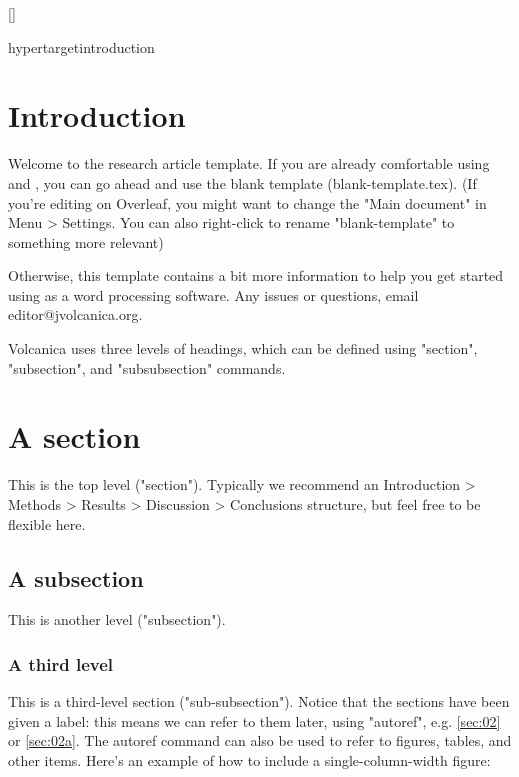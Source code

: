 \documentclass[draft, {\secondLanguage}, english]{VolcanicaStyle-production}
\author[{{\affiliation{1}}}] 				%
{\orcidaffil{0000.0000.0000.0000}~			%
Person A. G. Persondóttir%
\Email{email@address.io}} 		        	%
\author[{{\affiliation{2}}}] 				%
{\orcidaffil{0000.0000.0000.0000}~			%
Someone Else} 					        	%
\author[{{\affiliation{3}}}] 				%
{\orcidaffil{0000.0000.0000.0000}~			%
Another S. Cientist}						%
\affil[{{\affiliation{1}}}]{					%
The first affiliation.
}
\affil[{{\affiliation{2}}}]{					%
A second affiliation; note how it ends in a full stop.
}
\affil[{{\affiliation{3}}}]{					%
Somewhere else.}
\begin{document}
\FrontMatter{\protect{\lipsum[45]}}%
[]%
{					
}


hypertarget{introduction}{%
\section{Introduction}\label{introduction}}		%

Welcome to the \VOLCANICA research article \latex template. If you are already comfortable using \latex and \bibtex, you can go ahead and use the blank template (blank-template.tex). (If you're editing on Overleaf, you might want to change the "Main document" in Menu > Settings. You can also right-click to rename "blank-template" to something more relevant)

Otherwise, this template contains a bit more information to help you get started using \latex as a word processing software. Any issues or questions, email editor@jvolcanica.org.

Volcanica uses three levels of headings, which can be defined using "section", "subsection", and "subsubsection" commands.

\section{A section}\label{sec:02}
This is the top level ("section"). Typically we recommend an Introduction > Methods > Results > Discussion > Conclusions structure, but feel free to be flexible here.

\subsection{A subsection}\label{sec:02a}
This is another level ("subsection").

\subsubsection{A third level}\label{sec:02aa}
This is a third-level section ("sub-subsection"). Notice that the sections have been given a label: this means we can refer to them later, using "autoref", e.g. \autoref{sec:02} or \autoref{sec:02a}. The autoref command can also be used to refer to figures, tables, and other items. Here's an example of how to include a single-column-width figure:
\end{document}
